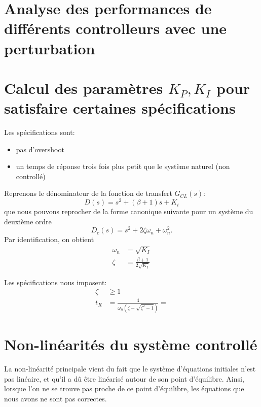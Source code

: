 \documentclass[frenchb, paper=a4, fontsize=11pt]{scrartcl}
\numberwithin{equation}{section}					%
\numberwithin{figure}{section}					%
\numberwithin{table}{section}						%
\begin{document}
\section{Analyse des performances de différents controlleurs avec une perturbation}



\section{Calcul des paramètres $K_P,K_I$ pour satisfaire certaines spécifications}

Les spécifications sont:
\begin{itemize}
\item pas d'overshoot
\item un temps de réponse trois fois plus petit que le système naturel (non controllé)
\end{itemize}

Reprenons le dénominateur de la fonction de transfert $G_{CL}(s)$:
\begin{equation}
D(s) = s^2 +(\beta+1)s + K_i
\end{equation}
que nous pouvons reprocher de la forme canonique suivante pour un système du deuxième ordre
\begin{equation}
D_c(s) = s^2 + 2\zeta \omega_n + \omega_n^2.
\end{equation}
Par identification, on obtient
\begin{align}
\omega_n &= \sqrt{K_I}\\
\zeta &= \frac{\beta +1}{2\sqrt{K_I}}
\end{align}

Les spécifications nous imposent:
\begin{align}
\zeta &\ge 1\\
t_R & = \frac{4}{\omega_n(\zeta - \sqrt{\zeta^2-1})} = 
\end{align}


\section{Non-linéarités du système controllé}
La non-linéarité principale vient du fait que le système d'équations initiales n'est pas linéaire, et qu'il a dû être linéarisé autour de son point d'équilibre. Ainsi, lorsque l'on ne se trouve pas proche de ce point d'équilibre, les équations que nous avons ne sont pas correctes.
\end{document}
